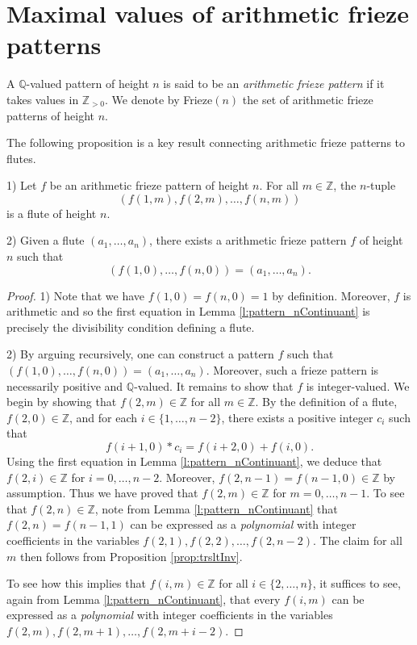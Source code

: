 \chapter{Maximal values of arithmetic frieze patterns}\label{s:arith_fp}
\begin{definition}
    \label{def:arith_fp}
        A $\mathbb{Q}$-valued pattern of height $n$ is said to be an \textit{arithmetic frieze pattern} if it takes 
        values in $\mathbb{Z}_{>0}$. 
        We denote by Frieze$(n)$ the set of arithmetic frieze patterns of height $n$. 
\end{definition}

The following proposition is a key result connecting arithmetic frieze patterns to flutes.
\begin{proposition}
    \label{prop:friezeToFlute}
1) Let $f$ be an arithmetic frieze pattern of height $n$. For all $m \in \mathbb{Z}$, the $n$-tuple
\[
    (f (1,m), f (2,m), \ldots, f (n,m))
\]
is a flute of height $n$.

2) Given a flute $(a_1, \ldots, a_n)$, there exists a arithmetic frieze pattern $f$ of height $n$ such that
\[
    (f (1,0), \ldots, f (n,0)) = (a_1, \ldots, a_n).
\]
\end{proposition}
\begin{proof}
    1) Note that we have $f(1,0) = f(n,0) = 1$ by definition. Moreover, $f$ is arithmetic and so the first 
    equation in Lemma \ref{l:pattern_nContinuant} is precisely the divisibility condition defining a flute.

    2) By arguing recursively, one can construct a pattern $f$ such that $ (f (1,0), \ldots, f (n,0)) = (a_1, \ldots, a_n)$. 
    Moreover, such a frieze pattern is necessarily positive and $\mathbb{Q}$-valued. It remains to show that $f$ is integer-valued. 
    We begin by showing that $f (2,m) \in \mathbb{Z}$ for all $m \in \mathbb{Z}$. 
    By the definition of a flute, $f (2,0) \in \mathbb{Z}$, and for each 
    $i \in \{1,\ldots, n-2\}$, there exists a positive integer $c_i$ such that
    \[
        f(i+1,0) * c_i = f (i+2,0) + f (i,0).    
    \]
    Using the first equation in Lemma \ref{l:pattern_nContinuant}, we deduce that $f(2,i) \in \mathbb{Z}$ for $i =0, \ldots, n-2$. 
    Moreover, $ f (2,n-1) = f (n-1,0) \in \mathbb{Z}$ by assumption. Thus we have proved that 
    $f (2,m) \in \mathbb{Z}$ for $m = 0, \ldots, n-1$. To see that $f (2,n) \in \mathbb{Z}$, note from 
    Lemma \ref{l:pattern_nContinuant} that $f (2,n) = f (n-1,1)$ can be expressed as a {\it polynomial} with 
    integer coefficients in the variables $f (2,1), f (2,2),\ldots , f (2,n-2)$. The claim for all $m$ then follows from 
    Proposition \ref{prop:trsltInv}. 

    To see how this implies that $f (i,m) \in \mathbb{Z}$ for all $i \in \{2, \ldots, n\}$, it suffices to 
    see, again from Lemma \ref{l:pattern_nContinuant}, that every $f (i,m)$ can be expressed as a {\it polynomial} with 
    integer coefficients in the variables $f (2,m), f (2,m+1),\ldots , f (2,m+i-2)$.

\end{proof}

